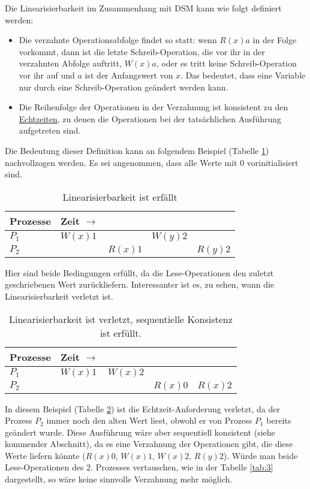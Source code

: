 Die Linearisierbarkeit im Zusammenhang mit DSM kann wie folgt definiert werden:
\begin{itemize}
	\item Die verzahnte Operationsabfolge findet so statt: wenn $R(x)a$ in der Folge vorkommt, dann ist die letzte Schreib-Operation, die vor ihr in der verzahnten Abfolge auftritt, $W(x)a$, oder es tritt keine Schreib-Operation vor ihr auf und $a$ ist der Anfangswert von $x$. Das bedeutet, dass eine Variable nur durch eine Schreib-Operation geändert werden kann.
	\item Die Reihenfolge der Operationen in der Verzahnung ist konsistent zu den \underline{Echtzeiten}, zu denen die Operationen bei der tatsächlichen Ausführung aufgetreten sind.
\end{itemize}

Die Bedeutung dieser Definition kann an folgendem Beispiel (Tabelle \ref{tab:1}) nachvollzogen werden. Es sei angenommen, dass alle Werte mit $0$ vorinitialisiert sind.

\begin{table}
	\centering
		\begin{tabular}{l | l l l l}
			\textbf{Prozesse} & \textbf{Zeit} $\rightarrow$ & \\
			\hline
			$P_{1}$ & $W(x)1$ & & $W(y)2$ \\
			$P_{2}$ & & $R(x)1$ & & $R(y)2$ \\
		\end{tabular}
	\caption{Linearisierbarkeit ist erfällt}
	\label{tab:1}
\end{table}

Hier sind beide Bedingungen erfüllt, da die Lese-Operationen den zuletzt geschriebenen Wert zurückliefern. Interessanter ist es, zu sehen, wann die Linearisierbarkeit verletzt ist.

\begin{table}
	\centering
		\begin{tabular}{l | l l l l}
		\textbf{Prozesse} & \textbf{Zeit} $\rightarrow$ \\
		\hline
		$P_{1}$ & $W(x)1$ & $W(x)2$ \\
		$P_{2}$ & & & \color{red} $R(x)0$ & \color{black} $R(x)2$ \\
		\end{tabular}
	\caption{Linearisierbarkeit ist verletzt, sequentielle Konsistenz ist erfüllt.}
	\label{tab:2}
\end{table}

In diesem Beispiel (Tabelle \ref{tab:2}) ist die Echtzeit-Anforderung verletzt, da der Prozess $P_{2}$ immer noch den alten Wert liest, obwohl er von Prozess $P_{1}$ bereits geändert wurde. Diese Ausführung wäre aber sequentiell konsistent (siehe kommender Abschnitt), da es eine Verzahnung der Operationen gibt, die diese Werte liefern könnte ($R(x)0$, $W(x)1$, $W(x)2$, $R(y)2$). Würde man beide Lese-Operationen des 2. Prozesses vertauschen, wie in der Tabelle \ref{tab:3} dargestellt, so wäre keine sinnvolle Verzahnung mehr möglich.

